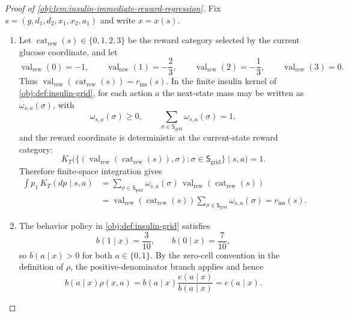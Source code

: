 \begin{proof}[Proof of \cref{obj:lem:insulin-immediate-reward-regression}]
Fix \(s=(g,d_1,d_2,x_1,x_2,a_1)\) and write \(x=x(s)\).

\begin{enumerate}
\item Let \(\operatorname{cat}_{\mathrm{rew}}(s)\in\{0,1,2,3\}\) be the reward category selected by the current glucose coordinate, and let
\[
\operatorname{val}_{\mathrm{rew}}(0)=-1,\qquad
\operatorname{val}_{\mathrm{rew}}(1)=-\frac23,\qquad
\operatorname{val}_{\mathrm{rew}}(2)=-\frac13,\qquad
\operatorname{val}_{\mathrm{rew}}(3)=0 .
\]
Thus \(\operatorname{val}_{\mathrm{rew}}(\operatorname{cat}_{\mathrm{rew}}(s))=r_{\mathrm{ins}}(s)\). In the finite insulin kernel of \cref{obj:def:insulin-grid}, for each action \(a\) the next-state mass may be written as \(\omega_{s,a}(\sigma)\), with
\[
\omega_{s,a}(\sigma)\ge 0,
\qquad
\sum_{\sigma\in\mathsf S_{\mathrm{grid}}}\omega_{s,a}(\sigma)=1,
\]
and the reward coordinate is deterministic at the current-state reward category:
\[
K_T\bigl(\{(\operatorname{val}_{\mathrm{rew}}(\operatorname{cat}_{\mathrm{rew}}(s)),\sigma):
\sigma\in\mathsf S_{\mathrm{grid}}\}\mid s,a\bigr)=1 .
\]
Therefore finite-space integration gives
\[
\begin{aligned}
\int p_1\,K_T(dp\mid s,a)
&=
\sum_{\sigma\in\mathsf S_{\mathrm{grid}}}
\omega_{s,a}(\sigma)\,
\operatorname{val}_{\mathrm{rew}}(\operatorname{cat}_{\mathrm{rew}}(s))  \\
&=
\operatorname{val}_{\mathrm{rew}}(\operatorname{cat}_{\mathrm{rew}}(s))
\sum_{\sigma\in\mathsf S_{\mathrm{grid}}}\omega_{s,a}(\sigma)
=
r_{\mathrm{ins}}(s).
\end{aligned}
\]

\item The behavior policy in \cref{obj:def:insulin-grid} satisfies
\[
b(1\mid x)=\frac{3}{10},
\qquad
b(0\mid x)=\frac{7}{10},
\]
so \(b(a\mid x)>0\) for both \(a\in\{0,1\}\). By the zero-cell convention in the definition of \(\rho\), the positive-denominator branch applies and hence
\[
b(a\mid x)\rho(x,a)
=
b(a\mid x)\frac{e(a\mid x)}{b(a\mid x)}
=
e(a\mid x).
\]


\end{enumerate}
\end{proof}
